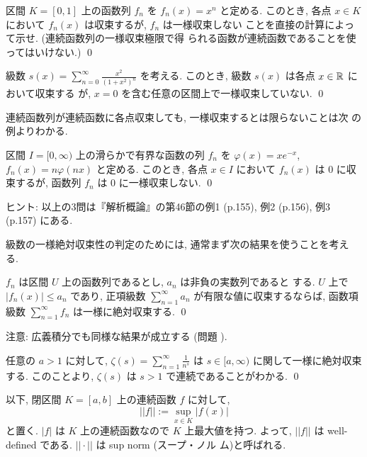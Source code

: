 \documentclass[12pt,twoside]{jarticle}
\begin{document}
\begin{question}
  区間 $K=[0,1]$ 上の函数列 $f_n$ を $f_n(x)=x^n$ と定める. このとき, 
  各点 $x\in K$ において $f_n(x)$ は収束するが, $f_n$ は一様収束しない
  ことを直接の計算によって示せ. (連続函数列の一様収束極限で得
  られる函数が連続函数であることを使ってはいけない.) \qed
\end{question}

\begin{question}
  級数 %
  \( \displaystyle
    s(x)=\sum_{n=0}^{\infty} \frac{x^2}{(1+x^2)^n}
  \) %
  を考える. このとき, 級数 $s(x)$ は各点 $x\in{\mathbb R}$ において収束する
  が, $x=0$ を含む任意の区間上で一様収束していない. \qed
\end{question}

連続函数列が連続函数に各点収束しても, 一様収束するとは限らないことは次
の例よりわかる.

\begin{question}\label{q:not-uniform1}
  区間 $I=[0,\infty)$ 上の滑らかで有界な函数の列 $f_n$ を %
  $\varphi(x) = x e^{-x}$, $f_n(x) = n \varphi(nx)$ と定める. 
  このとき, 各点 $x\in I$ において %
  $f_n(x)$ は $0$ に収束するが, 函数列 $f_n$ は $0$ に一様収束しない.
  \qed
\end{question}

\noindent ヒント: 以上の3問は『解析概論』の第46節の例1 (p.155), 例2 %
(p.156), 例3 (p.157) にある.

級数の一様絶対収束性の判定のためには, 通常まず次の結果を使うことを考え
る.

\begin{question}[一様絶対収束の判定法]\label{q:unif-abs-conv-series}
  $f_n$ は区間 $U$ 上の函数列であるとし, $a_n$ は非負の実数列であると
  する. $U$ 上で $|f_n(x)| \le a_n$ であり, %
  正項級数 $\sum\limits_{n=1}^\infty a_n$ が有限な値に収束するならば,
  函数項級数 $\sum\limits_{n=1}^\infty f_n$ は一様に絶対収束する.
  \qed
\end{question}

\noindent 注意: 広義積分でも同様な結果が成立する
(問題 ).

\begin{question}
  任意の $a>1$ に対して, %
  $\displaystyle \zeta(s)=\sum\limits_{n=1}^\infty \frac{1}{n^s}$
  は $s\in[a,\infty)$ に関して一様に絶対収束する. このことより, %
  $\zeta(s)$ は $s>1$ で連続であることがわかる.  \qed
\end{question}

以下, 閉区間 $K=[a,b]$ 上の連続函数 $f$ に対して,
\[
  ||f|| := \sup_{x\in K} |f(x)|
\]
と置く. $|f|$ は $K$ 上の連続函数なので $K$ 上最大値を持つ. よって, 
$||f||$ は well-defined である. $||\cdot||$ は sup norm (スープ・ノル
ム)と呼ばれる. 
\end{document}
